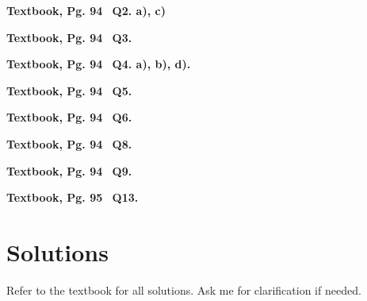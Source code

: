\documentclass[12pt]{article} %
\begin{document}
\begin{qstn}
  \textbf{Textbook, Pg. 94 \,\,\,Q2. a), c)}
\end{qstn}

\begin{qstn}
  \textbf{Textbook, Pg. 94 \,\,\,Q3.}
\end{qstn}

\begin{qstn}
  \textbf{Textbook, Pg. 94 \,\,\,Q4. a), b), d).}
\end{qstn}

\begin{qstn}
  \textbf{Textbook, Pg. 94 \,\,\,Q5.}
\end{qstn}


\begin{qstn}
  \textbf{Textbook, Pg. 94 \,\,\,Q6.}
\end{qstn}


\begin{qstn}
  \textbf{Textbook, Pg. 94 \,\,\,Q8.}
\end{qstn}

\begin{qstn}
  \textbf{Textbook, Pg. 94 \,\,\,Q9.}
\end{qstn}

\begin{qstn}
  \textbf{Textbook, Pg. 95 \,\,\,Q13.}
\end{qstn}

\section{Solutions}
Refer to the textbook for all solutions. Ask me for clarification if needed.
\end{document}
